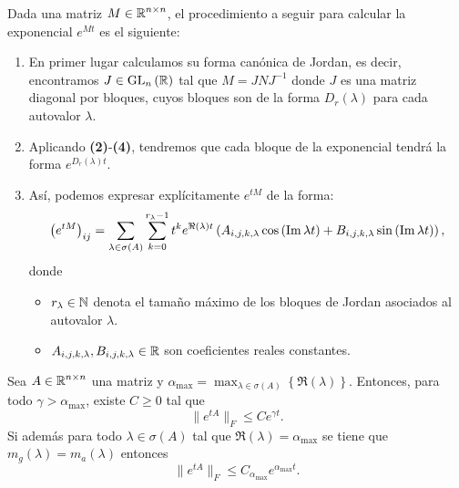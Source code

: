 \begin{observation}
Dada una matriz $\displaystyle M \in \mathbb{R} ^{n \times n} $, el procedimiento a seguir para calcular la exponencial $\displaystyle e^{Mt} $ es el siguiente:
\begin{enumerate}
\item En primer lugar calculamos su forma canónica de Jordan, es decir, encontramos $\displaystyle J \in \operatorname{GL}_{n}\left(\mathbb{R}\right) $ tal que $\displaystyle M = J N J^{-1} $ donde $\displaystyle J $ es una matriz diagonal por bloques, cuyos bloques son de la forma $\displaystyle D_{r}\left(\lambda \right) $ para cada autovalor $\displaystyle \lambda  $. 
\item Aplicando \textbf{(2)}-\textbf{(4)}, tendremos que cada bloque de la exponencial tendrá la forma $\displaystyle e^{D_{r}\left(\lambda \right)t} $. 
\item Así, podemos expresar explícitamente $\displaystyle e^{tM} $ de la forma:
	\[
		\left(e^{tM}\right)_{ij} = \sum^{}_{\lambda \in \sigma\left(A\right)}\sum^{r_{\lambda }-1}_{k = 0}t ^{k}e^{\Re\left(\lambda \right)t} \left(A_{i,j,k,\lambda }\cos\left(\operatorname{Im} \lambda t\right) + B_{i,j,k,\lambda }\sin\left(\operatorname{Im} \lambda t\right)\right) ,
		\]
	donde 
	\begin{itemize}
	\item $\displaystyle r_{\lambda }\in \mathbb{N} $ denota el tamaño máximo de los bloques de Jordan asociados al autovalor $\displaystyle \lambda  $.
	\item $\displaystyle A_{i,j,k,\lambda }, B_{i,j,k,\lambda }\in \mathbb{R} $ son coeficientes reales constantes. 
	\end{itemize}
\end{enumerate}
\end{observation}
\begin{prop}
	Sea $\displaystyle A\in \mathbb{R}^{n \times n} $ una matriz y $\displaystyle \alpha_{\max }= \max_{\lambda \in \sigma \left(A\right)} \left\{ \Re\left(\lambda \right)\right\}  $. Entonces, para todo $\displaystyle \gamma > \alpha_{\max } $, existe $\displaystyle C \geq 0 $ tal que 
	\[\|e^{tA}\|_{F}\leq Ce^{\gamma t} .\]
	Si además para todo $\displaystyle \lambda\in \sigma\left(A\right) $ tal que $\displaystyle \Re\left(\lambda \right)=\alpha_{\max } $ se tiene que $\displaystyle m_{g}\left(\lambda \right)=m_{a}\left(\lambda \right) $ entonces
	\[\|e^{tA}\|_{F}\leq C_{\alpha_{\max }}e^{\alpha_{\max }t} .\]	
\end{prop}
